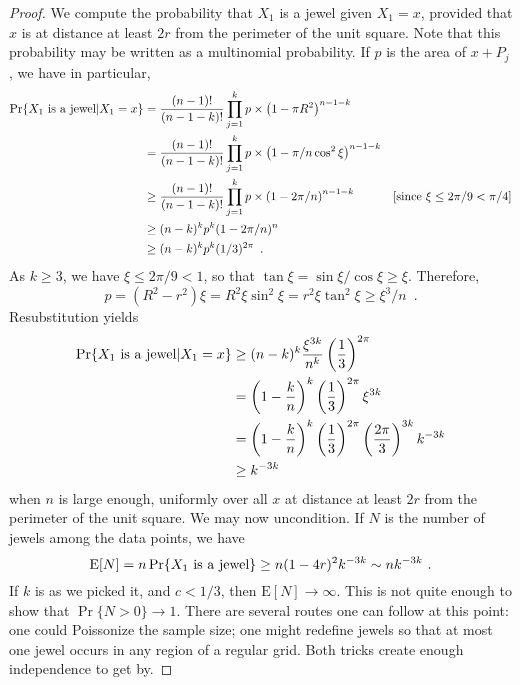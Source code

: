 \documentclass[lotsofwhite,charterfonts]{patmorin}
\newcommand{\PROB}{\Pr}
\newcommand{\EXP}{\mathrm{E}}
\begin{document}
\begin{proof}
We compute the probability that $X_1$ is a jewel
given $X_1 = x$, provided that $x$ is at distance at
least $2r$ from the perimeter of the unit square.
Note that this probability may be written as
a multinomial probability. If $p$ is the area
of $x+P_j$, we have in particular,
\[
\begin{aligned}
\PROB \{ X_1 ~\hbox{\rm is a jewel} | X_1 = x \}
&=  {(n-1)! \over (n-1-k)!} \prod_{j=1}^k p \times \left( 1 - \pi R^2 \right)^{n-1-k} \\
&=  {(n-1)! \over (n-1-k)!} \prod_{j=1}^k p \times \left( 1 - \pi/n\cos^2\xi \right)^{n-1-k} \\
&\ge  {(n-1)! \over (n-1-k)!} \prod_{j=1}^k p \times \left( 1 - 2\pi/n \right)^{n-1-k} & \mbox{[since $\xi \le 2\pi/9 < \pi/4$]} \\
 &\ge  (n-k)^k p^k (1-2\pi/n)^n \\
&\ge  (n-k)^k p^k (1/3)^{2\pi} \enspace . 
\end{aligned}
\]
As $k \ge 3$, we have $\xi \le 2\pi/9 < 1$, so that
$\tan \xi = \sin \xi / \cos \xi \ge \xi$.
Therefore, 
\[
p = (R^2 - r^2) \xi = R^2 \xi \sin^2 \xi
  = r^2 \xi \tan^2 \xi \ge \xi^3/n \enspace .
\]
Resubstitution yields
\[
\begin{aligned}
\PROB \{ X_1 ~\hbox{\rm is a jewel} | X_1 = x \}
& \ge (n-k)^k {\xi^{3k} \over n^k} \left( {1 \over 3} \right)^{2\pi} \\
& =   \left( 1 - {k \over n} \right)^k  
    \left( {1 \over 3} \right)^{2\pi}
    \xi^{3k} \\
& = \left( 1 - {k \over n} \right)^k  
    \left( {1 \over 3} \right)^{2\pi}
    \left({2\pi\over 3}\right)^{3k} k^{-3k}\\
& \ge k^{-3k}
\end{aligned}
\]
when $n$ is large enough, uniformly over all $x$
at distance at least $2r$ from the perimeter of the unit square.
We may now uncondition. If $N$ is the 
number of jewels among the data points, we have
\[
\EXP[N]
 = n \PROB \{ X_1 ~\hbox{\rm is a jewel} \}
 \ge n (1-4r)^2 k^{-3k}
 \sim n k^{-3k}~.
\]
If $k$ is as we picked it, and $c < 1/3$,
then $\EXP[N] \to \infty$.
This is not quite enough to show that 
$\PROB \{ N > 0 \} \to 1$.
There are several routes one can follow at this
point: one could Poissonize the sample
size; one might redefine jewels so that
at most one jewel occurs in any region of
a regular grid. Both tricks create
enough independence to get by.

\end{proof}
\end{document}

